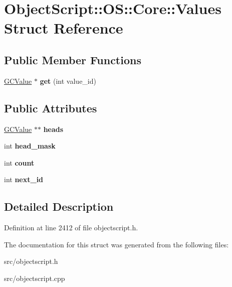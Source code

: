\hypertarget{struct_object_script_1_1_o_s_1_1_core_1_1_values}{}\section{Object\+Script\+:\+:OS\+:\+:Core\+:\+:Values Struct Reference}
\label{struct_object_script_1_1_o_s_1_1_core_1_1_values}
\subsection*{Public Member Functions}
\begin{DoxyCompactItemize}
\item 
\hyperlink{struct_object_script_1_1_o_s_1_1_core_1_1_g_c_value}{G\+C\+Value} $\ast$ {\bfseries get} (int value\+\_\+id)\hypertarget{struct_object_script_1_1_o_s_1_1_core_1_1_values_a034910a43f8bec0a4b505d64e25bb8df}{}\label{struct_object_script_1_1_o_s_1_1_core_1_1_values_a034910a43f8bec0a4b505d64e25bb8df}

\end{DoxyCompactItemize}
\subsection*{Public Attributes}
\begin{DoxyCompactItemize}
\item 
\hyperlink{struct_object_script_1_1_o_s_1_1_core_1_1_g_c_value}{G\+C\+Value} $\ast$$\ast$ {\bfseries heads}\hypertarget{struct_object_script_1_1_o_s_1_1_core_1_1_values_a1a6ef6600cb89b54cf62ac958390abdd}{}\label{struct_object_script_1_1_o_s_1_1_core_1_1_values_a1a6ef6600cb89b54cf62ac958390abdd}

\item 
int {\bfseries head\+\_\+mask}\hypertarget{struct_object_script_1_1_o_s_1_1_core_1_1_values_abce82a40e6701cbacdce5aaf06115cb2}{}\label{struct_object_script_1_1_o_s_1_1_core_1_1_values_abce82a40e6701cbacdce5aaf06115cb2}

\item 
int {\bfseries count}\hypertarget{struct_object_script_1_1_o_s_1_1_core_1_1_values_a8c4d627447c5d21be42160afa45e8e29}{}\label{struct_object_script_1_1_o_s_1_1_core_1_1_values_a8c4d627447c5d21be42160afa45e8e29}

\item 
int {\bfseries next\+\_\+id}\hypertarget{struct_object_script_1_1_o_s_1_1_core_1_1_values_aa1d63482c6de00594aea6b8c4ffeb759}{}\label{struct_object_script_1_1_o_s_1_1_core_1_1_values_aa1d63482c6de00594aea6b8c4ffeb759}

\end{DoxyCompactItemize}


\subsection{Detailed Description}


Definition at line 2412 of file objectscript.\+h.



The documentation for this struct was generated from the following files\+:\begin{DoxyCompactItemize}
\item 
src/objectscript.\+h\item 
src/objectscript.\+cpp\end{DoxyCompactItemize}
